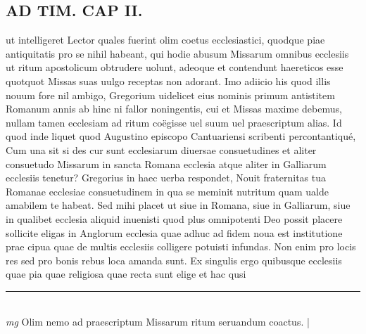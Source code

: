 \documentclass{article}
\begin{document}
\begin{pages}
\section*{AD TIM. CAP II. }
\marginpar{[ p.110 ]}\pstart ut intelligeret Lector quales fuerint olim coetus ecclesiastici, quodque piae antiquitatis pro se nihil habeant, qui hodie abusum Missarum omnibus ecclesiis ut ritum apostolicum obtrudere uolunt, adeoque et contendunt haereticos esse quotquot Missas suas uulgo receptas non adorant. Imo adiicio his quod illis nouum fore nil ambigo, Gregorium uidelicet eius nominis primum antistitem Romanum annis ab hinc ni fallor noningentis, cui et Missas maxime debemus, nullam tamen ecclesiam ad ritum coëgisse uel suum uel praescriptum alias. Id quod inde liquet quod Augustino episcopo Cantuariensi scribenti percontantiqué, Cum una sit si des cur sunt ecclesiarum diuersae consuetudines et aliter consuetudo Missarum in sancta Romana ecclesia atque aliter in Galliarum ecclesiis tenetur? Gregorius in haec uerba respondet, Nouit fraternitas tua Romanae ecclesiae consuetudinem in qua se meminit nutritum quam ualde amabilem te habeat. Sed mihi placet ut siue in Romana, siue in Galliarum, siue in qualibet ecclesia aliquid inuenisti quod plus omnipotenti Deo possit placere sollicite eligas in Anglorum ecclesia quae adhuc ad fidem noua est institutione prae cipua quae de multis ecclesiis colligere potuisti infundas. Non enim pro locis res sed pro bonis rebus loca amanda sunt. Ex singulis ergo quibusque ecclesiis quae pia quae religiosa quae recta sunt elige et hac qusi  \pend
\vspace{0.5cm}\noindent
\vspace{0.2cm}\rule{1cm}{0.2pt}\\ 
\hspace{0.2cm}\textit{mg}
\footnotesize Olim nemo ad praescriptum Missarum ritum seruandum coactus. 
\normalsize| 

\end{pages}
\end{document}
